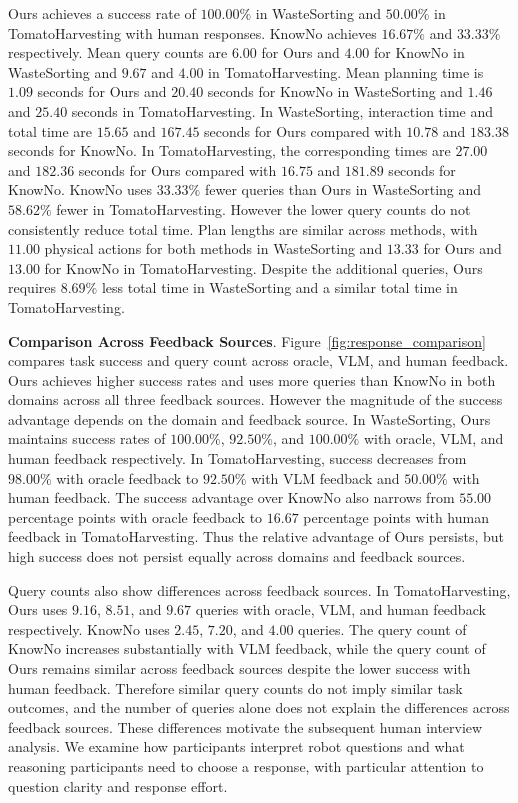 Ours achieves a success rate of $100.00\%$ in WasteSorting and $50.00\%$ in TomatoHarvesting with human responses. KnowNo achieves $16.67\%$ and $33.33\%$ respectively. Mean query counts are $6.00$ for Ours and $4.00$ for KnowNo in WasteSorting and $9.67$ and $4.00$ in TomatoHarvesting. Mean planning time is $1.09$ seconds for Ours and $20.40$ seconds for KnowNo in WasteSorting and $1.46$ and $25.40$ seconds in TomatoHarvesting. In WasteSorting, interaction time and total time are $15.65$ and $167.45$ seconds for Ours compared with $10.78$ and $183.38$ seconds for KnowNo. In TomatoHarvesting, the corresponding times are $27.00$ and $182.36$ seconds for Ours compared with $16.75$ and $181.89$ seconds for KnowNo. KnowNo uses $33.33\%$ fewer queries than Ours in WasteSorting and $58.62\%$ fewer in TomatoHarvesting. However the lower query counts do not consistently reduce total time. Plan lengths are similar across methods, with $11.00$ physical actions for both methods in WasteSorting and $13.33$ for Ours and $13.00$ for KnowNo in TomatoHarvesting. Despite the additional queries, Ours requires $8.69\%$ less total time in WasteSorting and a similar total time in TomatoHarvesting.

\noindent\textbf{Comparison Across Feedback Sources}\label{exp:response_comparison}. Figure~\ref{fig:response_comparison} compares task success and query count across oracle, VLM, and human feedback. Ours achieves higher success rates and uses more queries than KnowNo in both domains across all three feedback sources. However the magnitude of the success advantage depends on the domain and feedback source. In WasteSorting, Ours maintains success rates of $100.00\%$, $92.50\%$, and $100.00\%$ with oracle, VLM, and human feedback respectively. In TomatoHarvesting, success decreases from $98.00\%$ with oracle feedback to $92.50\%$ with VLM feedback and $50.00\%$ with human feedback. The success advantage over KnowNo also narrows from $55.00$ percentage points with oracle feedback to $16.67$ percentage points with human feedback in TomatoHarvesting. Thus the relative advantage of Ours persists, but high success does not persist equally across domains and feedback sources.

Query counts also show differences across feedback sources. In TomatoHarvesting, Ours uses $9.16$, $8.51$, and $9.67$ queries with oracle, VLM, and human feedback respectively. KnowNo uses $2.45$, $7.20$, and $4.00$ queries. The query count of KnowNo increases substantially with VLM feedback, while the query count of Ours remains similar across feedback sources despite the lower success with human feedback. Therefore similar query counts do not imply similar task outcomes, and the number of queries alone does not explain the differences across feedback sources. These differences motivate the subsequent human interview analysis. We examine how participants interpret robot questions and what reasoning participants need to choose a response, with particular attention to question clarity and response effort.


